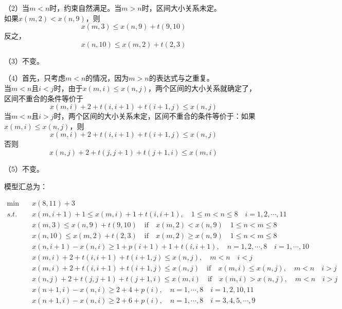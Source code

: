 \documentclass{ctexart}
\begin{document}
{{{            （2）当$m<n$时，约束自然满足。当$m>n$时，区间大小关系未定。\\
            如果$x(m, 2) < x(n, 9)$，则$$x(m, 3) \leq x(n, 9) + t(9, 10)$$ 反之，$$x(n, 10) \leq x(m, 2) + t(2, 3)$$
    
            （3）不变。
    
            （4）首先，只考虑$m<n$的情况，因为$m>n$的表达式与之重复。\\
            当$m<n$且$i<j$时，由于$x(m, i) \leq x(n, j)$，两个区间的大小关系就确定了，区间不重合的条件等价于
            $$x(m, i) + 2 + t(i, i+1) + t(i+1, j) \leq x(n, j)$$
            当$m<n$且$i>j$时，两个区间的大小关系未定，区间不重合的条件等价于：如果$x(m, i) \leq x(n, j)$，则
            $$x(m, i) + 2 + t(i, i+1) + t(i+1, j) \leq x(n, j)$$ 否则
            $$x(n, j) + 2 + t(j, j+1) + t(j+1, i) \leq x(m, i)$$
    
            （5）不变。
            
             模型汇总为：
    
		    $$
		    \begin{aligned}
		    \min \quad &x(8,11)+3 \\
		    s.t. \quad &x(m, i+1) + 1 \leq x(m, i) + 1 + t(i, i+1),\quad 1\leq m < n \leq 8\quad i=1,2,\cdots,11 \\
		    \quad &x(m, 3) \leq x(n, 9) + t(9, 10) \quad \mathrm{if} \quad x(m, 2) < x(n, 9)\quad 1\leq n < m\leq 8 \\
		    \quad &x(n, 10) \leq x(m, 2) + t(2, 3) \quad \mathrm{if} \quad x(m, 2) \geq x(n, 9)\quad 1\leq n < m\leq 8 \\
		    \quad &x(n, i+1) - x(n, i) \geq 1 + p(i+1) + 1 + t(i, i+1), \quad n=1,2,\cdots,8\quad i=1,\cdots,10 \\
		    \quad &x(m, i) + 2 + t(i, i+1) + t(i+1, j) \leq x(n, j), \quad m<n \quad i<j \\
		    \quad &x(m, i) + 2 + t(i, i+1) + t(i+1, j) \leq x(n, j) \quad \mathrm{if} \quad x(m, i) \leq x(n, j), \quad m<n \quad i>j \\
		    \quad &x(n, j) + 2 + t(j, j+1) + t(j+1, i) \leq x(m, i) \quad \mathrm{if} \quad x(m, i) > x(n, j), \quad m<n \quad i>j \\
		    \quad &x(n+1, i) - x(n, i) \geq 2 + 4 + p(i), \quad n=1,\cdots,8 \quad i = 1, 2, 10, 11 \\
		    \quad &x(n+1, i) - x(n, i) \geq 2 + 6 + p(i), \quad n=1,\cdots,8 \quad i = 3, 4, 5, \cdots, 9 \\
		    \end{aligned}
		    $$
		    
}}}
\end{document}
